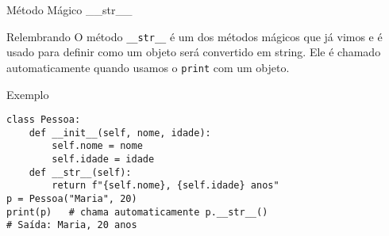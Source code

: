 \begin{frame}[fragile]{Método Mágico \_\_str\_\_}

    \begin{block}{Relembrando}
        O método \texttt{\_\_str\_\_} é um dos métodos mágicos que já vimos e é usado para definir como um objeto será convertido em string.
        Ele é chamado automaticamente quando usamos o \texttt{print} com um objeto.
    \end{block}

    \begin{exampleblock}{Exemplo}
        \begin{verbatim}
class Pessoa:
    def __init__(self, nome, idade):
        self.nome = nome
        self.idade = idade
    def __str__(self):
        return f"{self.nome}, {self.idade} anos"
p = Pessoa("Maria", 20)
print(p)   # chama automaticamente p.__str__()
# Saída: Maria, 20 anos
\end{verbatim}
    \end{exampleblock}

\end{frame}


